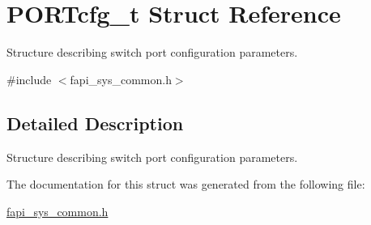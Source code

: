 \hypertarget{structPORTcfg__t}{\section{P\-O\-R\-Tcfg\-\_\-t Struct Reference}
\label{structPORTcfg__t}
}


Structure describing switch port configuration parameters.  




{\ttfamily \#include $<$fapi\-\_\-sys\-\_\-common.\-h$>$}



\subsection{Detailed Description}
Structure describing switch port configuration parameters. 

The documentation for this struct was generated from the following file\-:\begin{DoxyCompactItemize}
\item 
\hyperlink{fapi__sys__common_8h}{fapi\-\_\-sys\-\_\-common.\-h}\end{DoxyCompactItemize}

